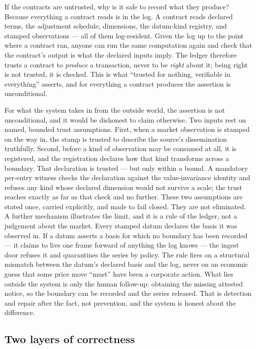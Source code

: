 If the contracts are untrusted, why is it safe to record what they produce?
Because everything a contract reads is in the log. A contract reads declared
terms, the adjustment schedule, dimensions, the datum-kind registry, and stamped
observations --- all of them log-resident. Given the log up to the point where a
contract ran, anyone can run the same computation again and check that the
contract's output is what the declared inputs imply. The ledger therefore trusts
a contract to \emph{produce} a transaction, never to be \emph{right} about it;
being right is not trusted, it is checked. This is what ``trusted for nothing,
verifiable in everything'' asserts, and for everything a contract produces the
assertion is unconditional.

For what the system takes in from the outside world, the assertion is not
unconditional, and it would be dishonest to claim otherwise. Two inputs rest on
named, bounded trust assumptions. First, when a market observation is stamped on
the way in, the stamp is trusted to describe the source's dissemination
truthfully. Second, before a kind of observation may be consumed at all, it is
registered, and the registration declares how that kind transforms across a
boundary. That declaration is trusted --- but only within a bound. A mandatory
per-entry witness checks the declaration against the value-invariance identity and
refuses any kind whose declared dimension would not survive a scale; the trust
reaches exactly as far as that check and no further. These two assumptions are
stated once, carried explicitly, and made to fail closed. They are not eliminated. A further mechanism illustrates the limit, and it is a
rule of the ledger, not a judgement about the market. Every stamped datum declares
the basis it was observed in. If a datum asserts a basis for which no boundary has
been recorded --- it claims to live one frame forward of anything the log knows ---
the ingest door refuses it and quarantines the series by policy. The rule fires on
a structural mismatch between the datum's declared basis and the log, never on an
economic guess that some price move ``must'' have been a corporate action. What
lies outside the system is only the human follow-up: obtaining the missing attested
notice, so the boundary can be recorded and the series released. That is detection
and repair after the fact, not prevention, and the system is honest about the
difference.

\subsection{Two layers of correctness}

